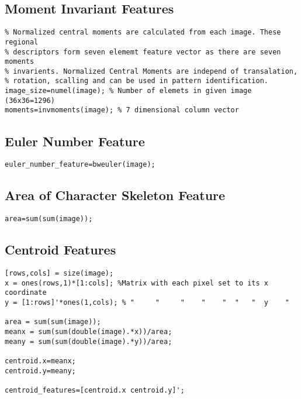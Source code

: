 \subsection*{Moment Invariant Features}
\begin{lstlisting}
% Normalized central moments are calculated from each image. These regional
% descriptors form seven elememt feature vector as there are seven moments
% invarients. Normalized Central Moments are independ of transalation,
% rotation, scalling and can be used in pattern identification.
image_size=numel(image); % Number of elemets in given image (36x36=1296)
moments=invmoments(image); % 7 dimensional column vector
\end{lstlisting}

\subsection*{Euler Number Feature}
\begin{lstlisting}
euler_number_feature=bweuler(image);
\end{lstlisting}

\subsection*{Area of Character Skeleton Feature}
\begin{lstlisting}
area=sum(sum(image));
\end{lstlisting}

\subsection*{Centroid Features}
\begin{lstlisting}
[rows,cols] = size(image);
x = ones(rows,1)*[1:cols]; %Matrix with each pixel set to its x coordinate
y = [1:rows]'*ones(1,cols); % "     "     "    "    "  "   "  y    "

area = sum(sum(image));
meanx = sum(sum(double(image).*x))/area;
meany = sum(sum(double(image).*y))/area;

centroid.x=meanx;
centroid.y=meany;

centroid_features=[centroid.x centroid.y]';
\end{lstlisting}

